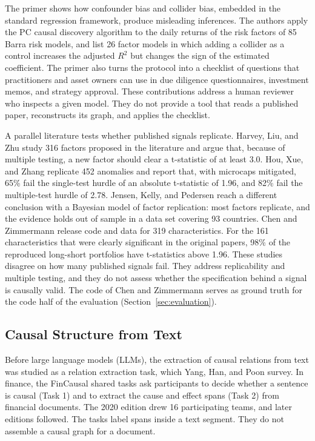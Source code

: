   The primer \cite{lopezdeprado2025primer} shows how confounder bias and
  collider bias, embedded in the standard regression framework, produce
  misleading inferences. The authors apply the PC causal discovery algorithm
  to the daily returns of the risk factors of 85 Barra risk models, and list
  26 factor models in which adding a collider as a control increases the
  adjusted $R^2$ but changes the sign of the estimated coefficient. The
  primer also turns the protocol into a checklist of questions that
  practitioners and asset owners can use in due diligence questionnaires,
  investment memos, and strategy approval. These contributions address a
  human reviewer who inspects a given model. They do not provide a tool that
  reads a published paper, reconstructs its graph, and applies the checklist.

  A parallel literature tests whether published signals replicate. Harvey,
  Liu, and Zhu \cite{harvey2016cross} study 316 factors proposed in the
  literature and argue that, because of multiple testing, a new factor
  should clear a t-statistic of at least 3.0. Hou, Xue, and Zhang
  \cite{hou2020replicating} replicate 452 anomalies and report that, with
  microcaps mitigated, 65\% fail the single-test hurdle of an absolute
  t-statistic of 1.96, and 82\% fail the multiple-test hurdle of 2.78.
  Jensen, Kelly, and Pedersen \cite{jensen2023replication} reach a different
  conclusion with a Bayesian model of factor replication: most factors
  replicate, and the evidence holds out of sample in a data set covering 93
  countries. Chen and Zimmermann \cite{chen2022open} release code and data
  for 319 characteristics. For the 161 characteristics that were clearly
  significant in the original papers, 98\% of the reproduced long-short
  portfolios have t-statistics above 1.96. These studies disagree on how many
  published signals fail. They address replicability and multiple testing,
  and they do not assess whether the specification behind a signal is
  causally valid. The code of Chen and Zimmermann serves as ground truth for
  the code half of the evaluation (Section~\ref{sec:evaluation}).

  \subsection{Causal Structure from Text}\label{sec:sota_text}

  Before large language models (LLMs), the extraction of causal relations
  from text was studied as a relation extraction task, which Yang, Han, and
  Poon \cite{yang2022survey} survey. In finance, the FinCausal shared tasks
  \cite{mariko2020fincausal} ask participants to decide whether a sentence is
  causal (Task 1) and to extract the cause and effect spans (Task 2) from
  financial documents. The 2020 edition drew 16 participating teams, and
  later editions followed. The tasks label spans inside a text segment. They
  do not assemble a causal graph for a document.

